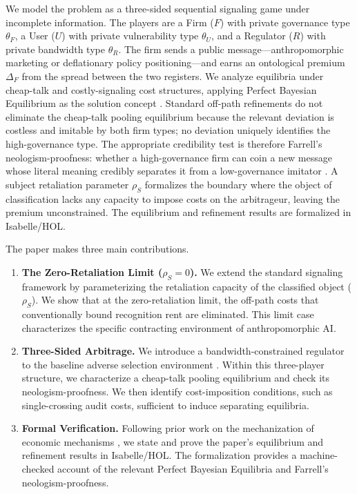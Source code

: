 We model the problem as a three-sided sequential signaling game under incomplete information. The players are a Firm ($F$) with private governance type $\theta_F$, a User ($U$) with private vulnerability type $\theta_U$, and a Regulator ($R$) with private bandwidth type $\theta_R$. The firm sends a public message---anthropomorphic marketing or deflationary policy positioning---and earns an ontological premium $\Delta_F$ from the spread between the two registers. We analyze equilibria under cheap-talk and costly-signaling cost structures, applying Perfect Bayesian Equilibrium as the solution concept \citep{kreps_wilson1982}. Standard off-path refinements do not eliminate the cheap-talk pooling equilibrium because the relevant deviation is costless and imitable by both firm types; no deviation uniquely identifies the high-governance type. The appropriate credibility test is therefore Farrell's neologism-proofness: whether a high-governance firm can coin a new message whose literal meaning credibly separates it from a low-governance imitator \citep{farrell1993}. A subject retaliation parameter $\rho_S$ formalizes the boundary where the object of classification lacks any capacity to impose costs on the arbitrageur, leaving the premium unconstrained. The equilibrium and refinement results are formalized in Isabelle/HOL.

The paper makes three main contributions.
\begin{enumerate}
\item \textbf{The Zero-Retaliation Limit ($\rho_S=0$).} We extend the standard signaling framework by parameterizing the retaliation capacity of the classified object ($\rho_S$). We show that at the zero-retaliation limit, the off-path costs that conventionally bound recognition rent are eliminated. This limit case characterizes the specific contracting environment of anthropomorphic AI.
\item \textbf{Three-Sided Arbitrage.} We introduce a bandwidth-constrained regulator to the baseline adverse selection environment \citep{akerlof1970}. Within this three-player structure, we characterize a cheap-talk pooling equilibrium and check its neologism-proofness. We then identify cost-imposition conditions, such as single-crossing audit costs, sufficient to induce separating equilibria.
\item \textbf{Formal Verification.} Following prior work on the mechanization of economic mechanisms \citep{caminati_kerber_lange_rowat_vcg2015,kerber_lange_rowat_intro2016}, we state and prove the paper's equilibrium and refinement results in Isabelle/HOL. The formalization provides a machine-checked account of the relevant Perfect Bayesian Equilibria and Farrell's neologism-proofness.
\end{enumerate}

